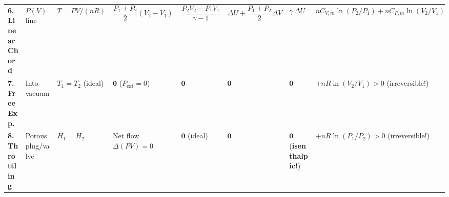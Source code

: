\documentclass[10pt,twoside,openany,letterpaper]{book}
\begin{document}
\begin{quicksheet}[QR-07 --- First Law ($\Delta U = Q - W_{\mathrm{by}}$), Master 8-Process Atlas \& Steady-Flow SFEE]
\begin{formulacard}
\begin{tabularx}{\linewidth}{@{}l l l l l l l X@{}}
\textbf{6. Linear Chord} & $P(V)$ line & $T = PV/(nR)$ & $\dfrac{P_1+P_2}{2}(V_2-V_1)$ & $\dfrac{P_2V_2-P_1V_1}{\gamma-1}$ & $\Delta U + \dfrac{P_1+P_2}{2}\Delta V$ & $\gamma\,\Delta U$ & $nC_{V,m}\ln(P_2/P_1) + nC_{P,m}\ln(V_2/V_1)$ \\
\textbf{7. Free Exp.} & Into vacuum & $T_1 = T_2$ (ideal) & $\mathbf{0}$ ($P_{\mathrm{ext}}=0$) & $\mathbf{0}$ & $\mathbf{0}$ & $\mathbf{0}$ & $+nR\ln(V_2/V_1) > 0$ (irreversible!) \\
\textbf{8. Throttling} & Porous plug/valve & $H_1 = H_2$ & Net flow $\Delta(PV)=0$ & $\mathbf{0}$ (ideal) & $\mathbf{0}$ & $\mathbf{0}$ (\textbf{isenthalpic!}) & $+nR\ln(P_1/P_2) > 0$ (irreversible!) \\
\bottomrule
\end{tabularx}
\end{formulacard}


\end{quicksheet}
\end{document}
